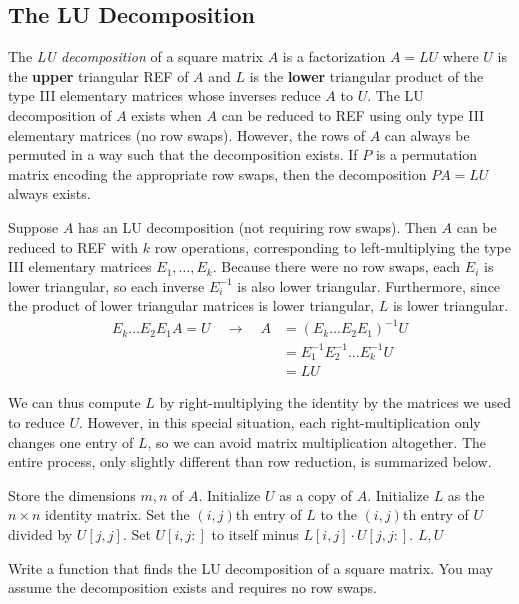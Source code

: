 \subsection*{The LU Decomposition} %

The \emph{LU decomposition} of a square matrix $A$ is a factorization $A=LU$ where $U$ is the \textbf{upper} triangular REF of $A$ and $L$ is the \textbf{lower} triangular product of the type III elementary matrices whose inverses reduce $A$ to $U$.
The LU decomposition of $A$ exists when $A$ can be reduced to REF using only type III elementary matrices (no row swaps).
However, the rows of $A$ can always be permuted in a way such that the decomposition exists.
If $P$ is a permutation matrix encoding the appropriate row swaps, then the decomposition $PA = LU$ always exists.

Suppose $A$ has an LU decomposition (not requiring row swaps).
Then $A$ can be reduced to REF with $k$ row operations, corresponding to left-multiplying the type III elementary matrices $E_1, \ldots, E_k$.
Because there were no row swaps, each $E_i$ is lower triangular, so each inverse $E_i^{-1}$ is also lower triangular.
Furthermore, since the product of lower triangular matrices is lower triangular, $L$ is lower triangular.
%
\begin{align*}
E_k\ldots E_2E_1 A = U\quad \longrightarrow\quad A &= (E_k \ldots E_2E_1)^{-1} U \\
&= E_1^{-1}E_2^{-1}\ldots E_k^{-1}U \\
&= LU
\end{align*}

We can thus compute $L$ by right-multiplying the identity by the matrices we used to reduce $U$.
However, in this special situation, each right-multiplication only changes one entry of $L$, so we can avoid matrix multiplication altogether.
The entire process, only slightly different than row reduction, is summarized below. %
%
\begin{algorithm}[H]
\begin{algorithmic}[1]
\State Store the dimensions $m, n$ of $A$.
\State Initialize $U$ as a copy of $A$.
\State Initialize $L$ as the $n\times n$ identity matrix.
    \State Set the $(i,j)$th entry of $L$ to the $(i,j)$th entry of $U$ divided by $U[j,j]$.
    \State Set $U[i,j:]$ to itself minus $L[i,j] \cdot U[j,j:]$.
    \EndFor
\EndFor
\State {} $L, U$
\EndProcedure
\end{algorithmic}
\end{algorithm}
%
\begin{problem}
Write a function that finds the LU decomposition of a square matrix.
You may assume the decomposition exists and requires no row swaps.
\label{prob:LU-Decomposition}
\end{problem}

